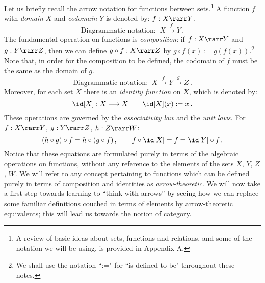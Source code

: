 \documentclass[12pt]{article}
\begin{document}
Let us briefly recall the arrow notation for functions between sets.\footnote{A review of basic ideas about sets, functions and relations, and some of the notation we will be using, is provided in Appendix A.} A
function $f$ with \emph{domain} $X$ and \emph{codomain} $Y$ is denoted by: $f : X \rarr Y$.
\[ \mbox{Diagrammatic notation:} \;\;  X \stackrel{f}{\longrightarrow} Y\,.\]
The fundamental operation on functions is \emph{composition}: if $f : X \rarr Y$ and $g : Y \rarr Z$, then we can define $g \circ f: X \rarr Z$ by $g \circ f(x) := g(f(x))$.\footnote{We shall use the notation ``:=" for ``is defined to be" throughout these notes.} Note that, in order for the composition to be defined, the codomain of $f$ must be the same as the domain of $g$.
\[  \mbox{Diagrammatic notation:}\;\; X \stackrel{f}{\longrightarrow} Y \stackrel{g}{\longrightarrow} Z\,. \]
Moreover, for each set $X$ there is an \emph{identity function} on $X$, which is denoted by:
\[ \id[X] : X \longrightarrow X\qquad \id[X](x) := x \,. \]
These operations are  governed by the \emph{associativity law} and the \emph{unit laws}. For $f : X \rarr Y$, $g: Y \rarr Z$, $h : Z \rarr W$:
\[ (h \circ g) \circ f = h \circ (g \circ f)\,, \qquad f\circ\id[X] = f = \id[Y]\circ f\,. \]
Notice that these equations are formulated purely in terms of the algebraic operations on functions, without any reference to the elements of the sets $X$, $Y$, $Z$, $W$.
We will refer to any concept pertaining to functions which can be defined purely in terms of composition and identities  as \emph{arrow-theoretic}.
We will now take a first step towards learning to ``think with arrows'' by seeing how we can replace some familiar definitions couched in terms of elements by arrow-theoretic equivalents; this will lead us towards the notion of category.
\end{document}
